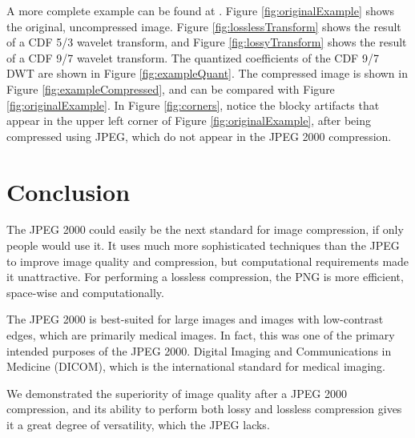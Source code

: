 \documentclass[titlepage,12pt]{article}
\begin{document}
A more complete example can be found at \cite{whydomath}.
Figure \ref{fig:originalExample} shows the original, uncompressed image.
Figure \ref{fig:losslessTransform} shows the result of a CDF 5/3 wavelet transform,
and Figure \ref{fig:lossyTransform} shows the result of a CDF 9/7 wavelet transform.
The quantized coefficients of the CDF 9/7 DWT are shown in Figure \ref{fig:exampleQuant}.
The compressed image is shown in Figure \ref{fig:exampleCompressed}, 
and can be compared with Figure \ref{fig:originalExample}.
In Figure \ref{fig:corners}, notice the blocky artifacts that appear in the upper left corner
of Figure \ref{fig:originalExample}, after being compressed using JPEG,
which do not appear in the JPEG 2000 compression.


\section{Conclusion}

The JPEG 2000 could easily be the next standard for image compression, if only people would use it.
It uses much more sophisticated techniques than the JPEG to improve image quality and compression,
but computational requirements made it unattractive.
For performing a lossless compression, the PNG is more efficient, space-wise and computationally.

The JPEG 2000 is best-suited for large images and images with low-contrast edges,
which are primarily medical images.
In fact, this was one of the primary intended purposes of the JPEG 2000.
Digital Imaging and Communications in Medicine (DICOM), 
which is the international standard for medical imaging.\cite{dicom}

We demonstrated the superiority of image quality after a JPEG 2000 compression, 
and its ability to perform both lossy and lossless compression gives it a 
great degree of versatility, which the JPEG lacks.


\printbibliography

\lstset{style=mystyle}

\clearpage
\fancyhf{}

\end{document}
